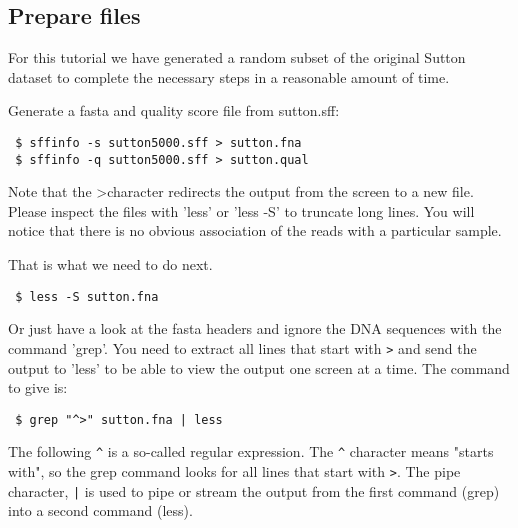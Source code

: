 \documentclass[a4paper,12pt,twoside]{memoir}
\begin{document}
\subsection{Prepare files}

\begin{note}
For this tutorial we have generated a random subset of the original Sutton dataset to complete the necessary steps in a reasonable amount of time.
\end{note}

\begin{steps}
Generate a fasta and quality score file from sutton.sff:
\begin{lstlisting}
 $ sffinfo -s sutton5000.sff > sutton.fna
 $ sffinfo -q sutton5000.sff > sutton.qual
\end{lstlisting}
\end{steps}

\begin{note}
Note that the \textgreater character redirects the output from the screen to a new file. Please inspect the files with 'less' or 'less -S' to truncate long lines. You will notice that there is no obvious association of the reads with a particular sample. 
\end{note}

\begin{steps}
That is what we need to do next. 
\begin{lstlisting}
 $ less -S sutton.fna
\end{lstlisting}
\end{steps}

\begin{note}
Or just have a look at the fasta headers and ignore the DNA sequences with the command 'grep'. You need to extract all lines that start with \texttt{>} and send the output to 'less' to be able to view the output one screen at a time. The command to give is:
\end{note}

\begin{steps}
\begin{lstlisting}
 $ grep "^>" sutton.fna | less
\end{lstlisting}
\end{steps}

\begin{information}
The following \texttt{\^} is a so-called regular expression. The \texttt{\^} character means "starts with", so the grep command looks for all lines that start with \texttt{>}. The pipe character, \texttt{|} is used to pipe or stream the output from the first command (grep) into a second command (less).
\end{information}
\end{document}
